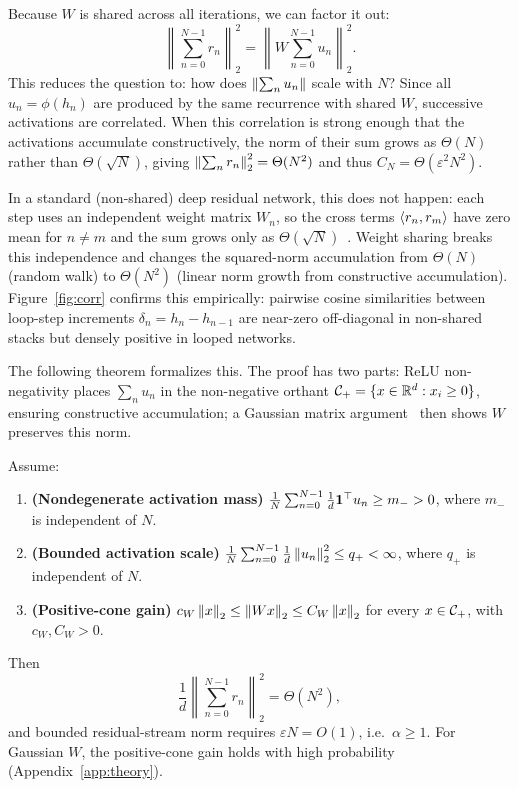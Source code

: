 Because $W$ is shared across all iterations, we can factor it out:
\[
  \left\|\sum_{n=0}^{N-1}r_n\right\|_2^2
  =
  \left\|W\sum_{n=0}^{N-1}u_n\right\|_2^2.
\]
This reduces the question to: how does $\left\lVert \sum_n u_n \right\rVert$ scale with $N$?
Since all $u_n=\phi(h_n)$ are produced by the same recurrence with shared $W$, successive activations are correlated.
When this correlation is strong enough that the activations accumulate constructively, the norm of their sum grows as $\Theta(N)$ rather than $\Theta(\!\sqrt{N})$, giving $\left\lVert \sum_n r_n \right\rVert_2^2=\Theta(N^2)$ and thus $C_N=\Theta(\varepsilon^2 N^2)$.

In a standard (non-shared) deep residual network, this does not happen: each step uses an independent weight matrix $W_n$, so the cross terms $\left\langle r_n, r_m \right\rangle$ have zero mean for $n\ne m$ and the sum grows only as $\Theta(\!\sqrt{N})$~\citep{bordelon2024depthwise,dey2025completep}.
Weight sharing breaks this independence and changes the squared-norm accumulation from $\Theta(N)$ (random walk) to $\Theta(N^2)$ (linear norm growth from constructive accumulation).
Figure~\ref{fig:corr} confirms this empirically: pairwise cosine similarities between loop-step increments $\delta_n=h_n-h_{n-1}$ are near-zero off-diagonal in non-shared stacks but densely positive in looped networks.

The following theorem formalizes this.
The proof has two parts: ReLU non-negativity places $\sum_n u_n$ in the non-negative orthant $\mathcal{C}_{+}=\{x\in\mathbb{R}^d: x_i\ge 0\}$, ensuring constructive accumulation; a Gaussian matrix argument~\citep{gordon1988milman} then shows $W$ preserves this norm.

\begin{theorem}
  \label{thm:alpha1}
  Assume:
  \begin{enumerate}
    \item \textbf{(Nondegenerate activation mass)}
      $\frac{1}{N}\sum_{n=0}^{N-1}\frac{1}{d}\mathbf{1}^\top u_n\ge m_->0$, where $m_-$ is independent of $N$.
    \item \textbf{(Bounded activation scale)}
      $\frac{1}{N}\sum_{n=0}^{N-1}\frac{1}{d}\left\lVert u_n \right\rVert_2^2\le q_+<\infty$, where $q_+$ is independent of $N$.
    \item \textbf{(Positive-cone gain)}
      $c_W\left\lVert x \right\rVert_2\le\left\lVert Wx \right\rVert_2\le C_W\left\lVert x \right\rVert_2$ for every $x\in\mathcal{C}_{+}$, with $c_W,C_W>0$.
  \end{enumerate}
  Then
  \[
    \frac{1}{d}\left\|\sum_{n=0}^{N-1}r_n\right\|_2^2
    =
    \Theta(N^2),
  \]
  and bounded residual-stream norm requires $\varepsilon N=O(1)$, i.e.\ $\alpha\ge 1$.
  For Gaussian $W$, the positive-cone gain holds with high probability (Appendix~\ref{app:theory}).
\end{theorem}

